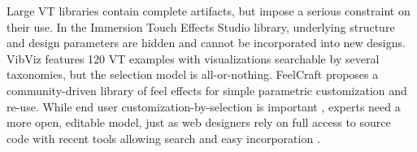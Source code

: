 Large VT libraries contain complete artifacts, but impose a serious constraint on their use.
In the Immersion Touch Effects Studio library,
underlying structure and design parameters are hidden and cannot be incorporated into new designs. %
VibViz \cite{Seifi2015} features 120 VT examples with visualizations searchable by several taxonomies, but the selection model is all-or-nothing.
FeelCraft \cite{SchneiderAsiaHaptics2014} proposes a community-driven library of feel effects \cite{Israr2014} for simple parametric customization and re-use. %
While end user customization-by-selection is important \cite{Seifi2014},  
experts need a more open, editable model,
just as web designers rely on full access to source code with recent tools allowing search and easy incorporation %
\cite{Lee2010a}.



